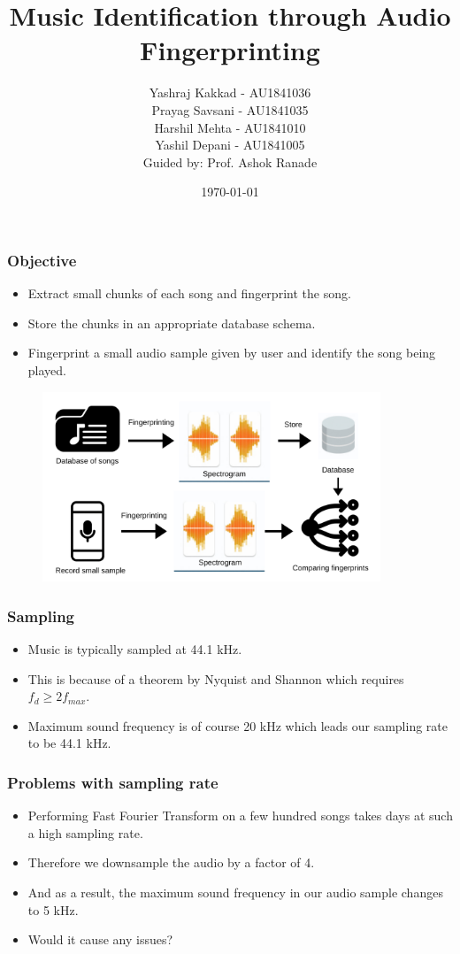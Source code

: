 \documentclass{beamer}
\author{Yashraj Kakkad - AU1841036 \\
        Prayag Savsani - AU1841035 \\
        Harshil Mehta - AU1841010 \\
        Yashil Depani - AU1841005 \\
        \vspace{8pt}Guided by: Prof. Ashok Ranade}
\title{Music Identification through Audio Fingerprinting}
\institute{Ahmedabad University}
\date{\today}
\begin{document}
\maketitle

\begin{frame}[t] %
\frametitle{Objective}
\begin{itemize}
    \item Extract small chunks of each song and fingerprint the song.
    \item Store the chunks in an appropriate database schema. 
    \item Fingerprint a small audio sample given by user and identify the song being played.
\end{itemize}
\begin{figure}
    \includegraphics[width=0.9\textwidth]{Flowchart.png}
\end{figure}
\end{frame}

\begin{frame}[t]
\frametitle{Sampling}
\begin{itemize}
    \item Music is typically sampled at \alert{44.1 kHz}.
    \item This is because of a theorem by \alert{Nyquist and Shannon} which requires \(f_{d} \ge 2f_{max}\).
    \item Maximum sound frequency is of course 20 kHz which leads our sampling rate to be 44.1 kHz.
\end{itemize}        
\end{frame}


\begin{frame}[t]
    \frametitle{Problems with sampling rate}
    \begin{itemize}
        \item Performing \alert{Fast Fourier Transform} on a few hundred songs takes days at such a high sampling rate.
        \item Therefore we downsample the audio by \alert{a factor of 4}. 
        \item And as a result, the maximum sound frequency in our audio sample changes to \alert{5 kHz}. 
        \item Would it cause any issues?
    \end{itemize}
\end{frame}
\end{document}
